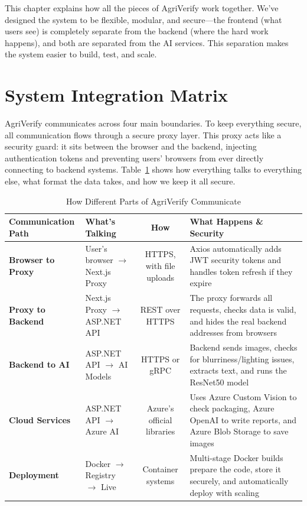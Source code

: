 This chapter explains how all the pieces of AgriVerify work together. We've designed the system to be flexible, modular, and secure—the frontend (what users see) is completely separate from the backend (where the hard work happens), and both are separated from the AI services. This separation makes the system easier to build, test, and scale.

\section{System Integration Matrix}

AgriVerify communicates across four main boundaries. To keep everything secure, all communication flows through a secure proxy layer. This proxy acts like a security guard: it sits between the browser and the backend, injecting authentication tokens and preventing users' browsers from ever directly connecting to backend systems. Table~\ref{tab:integration_matrix} shows how everything talks to everything else, what format the data takes, and how we keep it all secure.

\begin{table}[htbp]
\centering
\caption{How Different Parts of AgriVerify Communicate}
\label{tab:integration_matrix}
\small
\begin{tabularx}{\linewidth}{@{} p{2.8cm} p{3.2cm} c X @{}}
\toprule
\textbf{Communication Path} & \textbf{What's Talking} & \textbf{How} & \textbf{What Happens \& Security} \\
\midrule
\textbf{Browser to Proxy} & User's browser $\rightarrow$ Next.js Proxy & HTTPS, with file uploads & Axios automatically adds JWT security tokens and handles token refresh if they expire \\
\addlinespace
\textbf{Proxy to Backend} & Next.js Proxy $\rightarrow$ ASP.NET API & REST over HTTPS & The proxy forwards all requests, checks data is valid, and hides the real backend addresses from browsers \\
\addlinespace
\textbf{Backend to AI} & ASP.NET API $\rightarrow$ AI Models & HTTPS or gRPC & Backend sends images, checks for blurriness/lighting issues, extracts text, and runs the ResNet50 model \\
\addlinespace
\textbf{Cloud Services} & ASP.NET API $\rightarrow$ Azure AI & Azure's official libraries & Uses Azure Custom Vision to check packaging, Azure OpenAI to write reports, and Azure Blob Storage to save images \\
\addlinespace
\textbf{Deployment} & Docker $\rightarrow$ Registry $\rightarrow$ Live & Container systems & Multi-stage Docker builds prepare the code, store it securely, and automatically deploy with scaling \\
\bottomrule
\end{tabularx}
\end{table}

